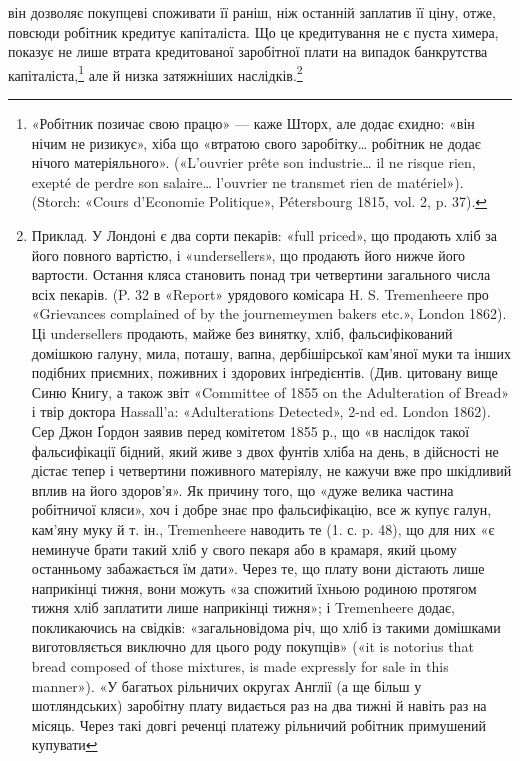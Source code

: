 \parcont{}  %
він дозволяє покупцеві споживати її раніш, ніж останній заплатив
її ціну, отже, повсюди робітник кредитує капіталіста. Що це
кредитування не є пуста химера, показує не лише втрата кредитованої
заробітної плати на випадок банкрутства капіталіста,\footnote{
«Робітник позичає свою працю» — каже Шторх, але додає єхидно:
«він нічим не ризикує», хіба що «втратою свого заробітку\dots{} робітник не
додає нічого матеріяльного». («L’ouvrier prête son industrie\dots{} il ne risque
rien, exepté de perdre son salaire\dots{} l’ouvrier ne transmet rien de matériel»).
(Storch: «Cours d’Economie Politique», Pétersbourg 1815, vol. 2, p. 37).
}
але й низка затяжніших наслідків.\footnote{
Приклад. У Лондоні є два сорти пекарів: «full priced», що продають
хліб за його повного вартістю, і «undersellers», що продають його
нижче його вартости. Остання кляса становить понад три четвертини
загального числа всіх пекарів. (P. 32 в «Report» урядового комісара
H. S. Tremenheere про «Grievances complained of by the journemeymen
bakers etc.», London 1862). Ці undersellers продають, майже без винятку,
хліб, фальсифікований домішкою галуну, мила, поташу, вапна, дербішірської
кам’яної муки та інших подібних приємних, поживних і здорових
інґредієнтів. (Див. цитовану вище Синю Книгу, а також звіт «Committee
of 1855 on the Adulteration of Bread» і твір доктора Hassall’a: «Adulterations
Detected», 2-nd ed. London 1862). Сер Джон Ґордон заявив
перед комітетом 1855 р., що «в наслідок такої фальсифікації бідний, який
живе з двох фунтів хліба на день, в дійсності не дістає тепер і четвертини
поживного матеріялу, не кажучи вже про шкідливий вплив на його здоров’я».
Як причину того, що «дуже велика частина робітничої кляси»,
хоч і добре знає про фальсифікацію, все ж купує галун, кам’яну муку
й т. ін., Tremenheere наводить те (1. с. p. 48), що для них «є неминуче
брати такий хліб у свого пекаря або в крамаря, який цьому останньому
забажається їм дати». Через те, що плату вони дістають лише наприкінці
тижня, вони можуть «за спожитий їхньою родиною протягом
тижня хліб заплатити лише наприкінці тижня»; і Tremenheere додає,
покликаючись на свідків: «загальновідома річ, що хліб із такими домішками
виготовляється виключно для цього роду покупців» («it is notorius
that bread composed of those mixtures, is made expressly for sale in this
manner»). «У багатьох рільничих округах Англії (а ще більш у шотляндських)
заробітну плату видається раз на два тижні й навіть раз на місяць.
Через такі довгі реченці платежу рільничий робітник примушений купувати
}

